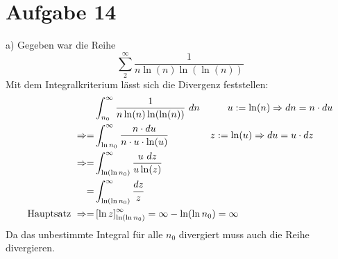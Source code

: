 \documentclass[10pt]{article}
\begin{document}
\newpage
\setlength{\headheight}{0cm}

\section*{Aufgabe 14}

a) Gegeben war die Reihe
\[
	\sum_2^\infty \frac{1}{n \ln(n) \ln(\ln(n))}
\]
Mit dem Integralkriterium lässt sich die Divergenz feststellen:
\begin{align*}
	&\int_{n_0}^\infty \frac{1}{n \ln(n) \ln(\ln(n))} \ dn \hspace{1cm}
	u := \ln(n) \Rightarrow dn = n \cdot du \\
	\Rightarrow 
	= &\int_{\ln n_0}^\infty \frac{n \cdot du}{n \cdot u \cdot \ln(u)} 
	\hspace{1.5cm} z := \ln(u) \Rightarrow du = u \cdot dz \\
	\Rightarrow
	= &\int_{\ln(\ln n_0)}^\infty \frac{u \ dz}{u \ln(z)} \\
	= &\int_{\ln(\ln n_0)}^\infty \frac{dz}{z} \\
	\text{Hauptsatz } \Rightarrow =
	& \left[\ln z \right]_{\ln(\ln n_0)}^\infty = \infty - \ln(\ln n_0)
	= \infty
\end{align*}
Da das unbestimmte Integral für alle $n_0$ divergiert muss auch die Reihe 
divergieren.
\end{document}
